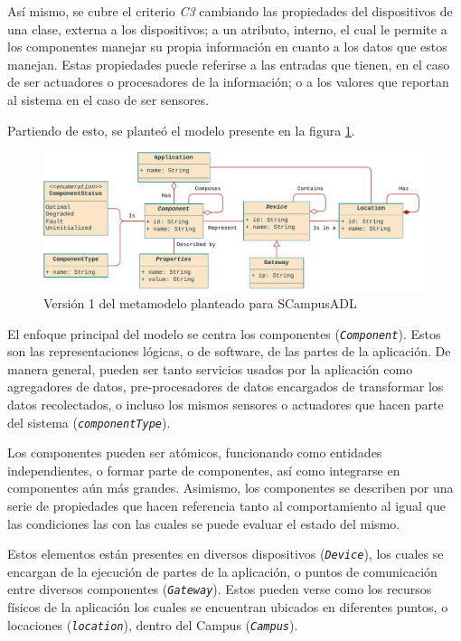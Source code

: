 Así mismo, se cubre el criterio \textit{C3} cambiando las propiedades del dispositivos de una clase, externa a los dispositivos; a un atributo, interno, el cual le permite a los componentes manejar su propia información en cuanto a los datos que estos manejan. Estas propiedades puede referirse a las entradas que tienen, en el caso de ser actuadores o procesadores de la información; o a los valores que reportan al sistema en el caso de ser sensores.

Partiendo de esto, se planteó el modelo presente en la figura \ref{fig:metamodelo}.

\begin{figure}[H]
    \centering
    \caption{Versión 1 del metamodelo planteado para SCampusADL}
    \label{fig:metamodelo}
    \vspace{2mm}
    \includegraphics[width=\linewidth]{images/Metamodel B.pdf}
\end{figure}

El enfoque principal del modelo se centra los componentes (\texttt{\textit{Component}}). Estos son las representaciones lógicas, o de software, de las partes de la aplicación. De manera general, pueden ser tanto servicios usados por la aplicación como agregadores de datos, pre-procesadores de datos encargados de transformar los datos recolectados, o incluso los mismos sensores o actuadores que hacen parte del sistema (\textit{\texttt{componentType}}). 

Los componentes pueden ser atómicos, funcionando como entidades independientes, o formar parte de componentes, así como integrarse en componentes aún más grandes. Asimismo, los componentes se describen por una serie de propiedades que hacen referencia tanto al comportamiento al igual que las condiciones las con las cuales se puede evaluar el estado del mismo. 

Estos elementos están presentes en diversos dispositivos (\texttt{\textit{Device}}), los cuales se encargan de la ejecución de partes de la aplicación, o puntos de comunicación entre diversos componentes (\textit{\texttt{Gateway}}). Estos pueden verse como los recursos físicos de la aplicación los cuales se encuentran ubicados en diferentes puntos, o locaciones (\textit{\texttt{location}}), dentro del Campus (\textit{\texttt{Campus}}). 

